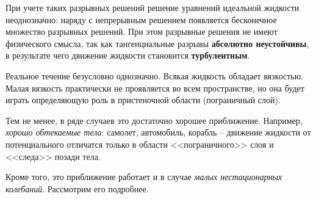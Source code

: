 При учете таких разрывных решений решение уравнений идеальной жидкости неоднозначно: наряду с непрерывным решением появляется бесконечное множество разрывных решений. При этом разрывные решения не имеют физического смысла, так как тангенциальные разрывы \textbf{абсолютно неустойчивы}, в результате чего движение жидкости становится \textbf{турбулентным}.

Реальное течение безусловно однозначно. Всякая жидкость обладает вязкостью. Малая вязкость практически не проявляется во всем пространстве, но она будет играть определяющую роль в пристеночной области (пограничный слой).

Тем не менее, в ряде случаев это достаточно хорошее приближение.  Например, \textit{хорошо обтекаемые тела}: самолет, автомобиль, корабль -- движение жидкости от потенциального отличатся только в области <<пограничного>> слоя и <<следа>> позади тела.

Кроме того, это приближение работает и в случае \textit{малых нестационарных колебаний}. Рассмотрим его подробнее.


